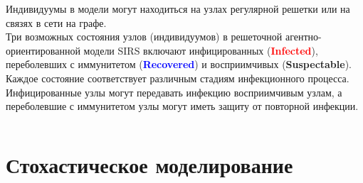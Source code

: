 \documentclass[
    11pt, %
    aspectratio=169, %
]{beamer}
\begin{document}
\begin{frame}
\begin{columns}[t]
        \begin{column}{0.6\textwidth}
            Индивидуумы в модели могут находиться на узлах регулярной решетки или на связях в сети на графе. \\
            Три возможных состояния узлов (индивидуумов) в решеточной агентно-ориентированной модели SIRS включают инфицированных (\textcolor{red}{\textbf{Infected}}), переболевших с иммунитетом (\textcolor{blue}{\textbf{Recovered}}) и восприимчивых (\textbf{Suspectable}). Каждое состояние соответствует различным стадиям инфекционного процесса. \\
            Инфицированные узлы могут передавать инфекцию восприимчивым узлам, а переболевшие с иммунитетом узлы могут иметь защиту от повторной инфекции.
        \end{column}
	\end{columns}

\end{frame}

\section{Стохастическое моделирование}
\end{document}
